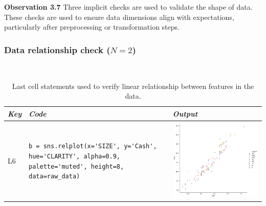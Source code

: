 \documentclass[smallextended]{svjour3}       %
\newcommand{\highlight}[1]{\begin{framed}%
  \noindent#1
\end{framed}}
\begin{document}
\highlight{\textbf{Observation 3.7} Three implicit checks are used to validate the shape of data. These checks are used to ensure data dimensions align with expectations, particularly after preprocessing or transformation steps.}

\subsubsection{Data relationship check ($N = 2$)}~\label{sec:linear-relation-output}

\begin{table}
	\centering
	\caption{Last cell statements used to verify linear relationship between features in the data.}
	\begin{tabular}{@{}m{} m{} m{}@{}}
		\toprule
		\emph{\textbf{Key}}                                                                                                   &
		\emph{\textbf{Code}}                                                                                                  &
		\emph{\textbf{Output}}                                                                                                  \\
		\midrule

		L6                                                                                                                    &
		\lstinline[]$b = sns.relplot(x='SIZE', y='Cash', hue='CLARITY', alpha=0.9, palette='muted', height=8, data=raw_data)$ &
		\includegraphics[width=\linewidth]{linear-relation-check-lineplot.png}                                                  \\


\end{tabular}
\end{table}
\end{document}
